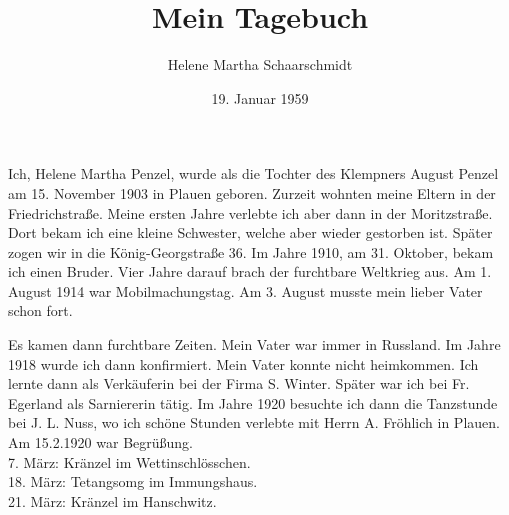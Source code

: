 \documentclass[a5paper]{book}
\title{Mein Tagebuch}
\author{Helene Martha Schaarschmidt}
\date{19. Januar 1959}
\begin{document}
\maketitle

\newpage
\setcounter{page}{1}
Ich, Helene Martha Penzel, wurde als die Tochter des Klempners August Penzel am 15. November 1903 in Plauen geboren. 
Zurzeit wohnten meine Eltern in der Friedrichstraße.
Meine ersten Jahre verlebte ich aber dann in der Moritzstraße. 
Dort bekam ich eine kleine Schwester, welche aber wieder gestorben ist. 
Später zogen wir in die König-Georgstraße 36.
Im Jahre 1910, am 31. Oktober, bekam ich einen Bruder. 
Vier Jahre darauf brach der furchtbare Weltkrieg aus.
Am 1. August 1914 war Mobilmachungstag. 
Am 3. August musste mein lieber Vater schon fort.

Es kamen dann furchtbare Zeiten.
Mein Vater war immer in Russland.
Im Jahre 1918 wurde ich dann konfirmiert. 
Mein Vater konnte nicht heimkommen. 
Ich lernte dann als Verkäuferin bei der Firma S. Winter.
Später war ich bei Fr. Egerland als Sarniererin tätig.
Im Jahre 1920 besuchte ich dann die Tanzstunde bei J. L. Nuss, wo ich schöne Stunden verlebte mit Herrn A. Fröhlich in Plauen.
Am 15.2.1920 war Begrüßung.\\
7. März: Kränzel im Wettinschlösschen.\\
18. März: Tetangsomg im Immungshaus.\\
21. März: Kränzel im Hanschwitz.


\newpage
\end{document}
